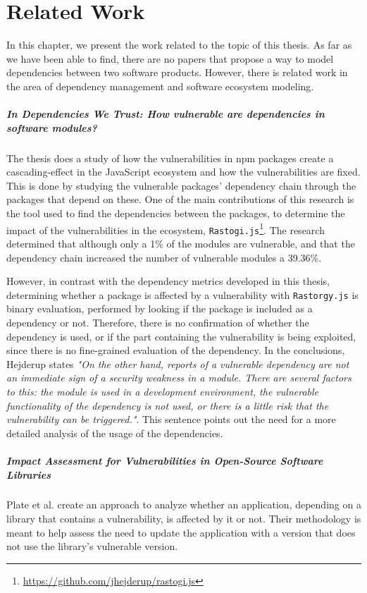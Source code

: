\chapter{Related Work}\label{ch:RelatedWork}
In this chapter, we present the work related to the topic of this thesis.
As far as we have been able to find, there are no papers that propose a way to model dependencies between two software products. However, there is related work in the area of dependency management and software ecosystem modeling.

\paragraph{In Dependencies We Trust: How vulnerable are dependencies in software modules? \cite{hejderup2015dependencies}}
The thesis does a study of how the vulnerabilities in npm packages create a cascading-effect in the JavaScript ecosystem and how the vulnerabilities are fixed. This is done by studying the vulnerable packages' dependency chain through the packages that depend on these. One of the main contributions of this research is the tool used to find the dependencies between the packages, to determine the impact of the vulnerabilities in the ecosystem, \texttt{Rastogi.js}\footnote{\href{https://github.com/jhejderup/rastogi.js}{https://github.com/jhejderup/rastogi.js}}. The research determined that although only a 1\% of the modules are vulnerable, and that the dependency chain increased the number of vulnerable modules a 39.36\%.

However, in contrast with the dependency metrics developed in this thesis, determining whether a package is affected by a vulnerability with \texttt{Rastorgy.js} is binary evaluation, performed by looking if the package is included as a dependency or not. Therefore, there is no confirmation of whether the dependency is used, or if the part containing the vulnerability is being exploited, since there is no fine-grained evaluation of the dependency. In the conclusions, Hejderup states \textit{"On the other hand, reports of a vulnerable dependency are not an immediate sign of a security weakness in a module. There are several factors to this: the module is used in a development environment, the vulnerable functionality of the dependency is not used, or there is a little risk that the vulnerability can be triggered."}. This sentence points out the need for a more detailed analysis of the usage of the dependencies.

\paragraph{Impact Assessment for Vulnerabilities in Open-Source Software Libraries \cite{plate2015impact}}
Plate et al. create an approach to analyze whether an application, depending on a library that contains a vulnerability, is affected by it or not. Their methodology is meant to help assess the need to update the application with a version that does not use the library's vulnerable version.

